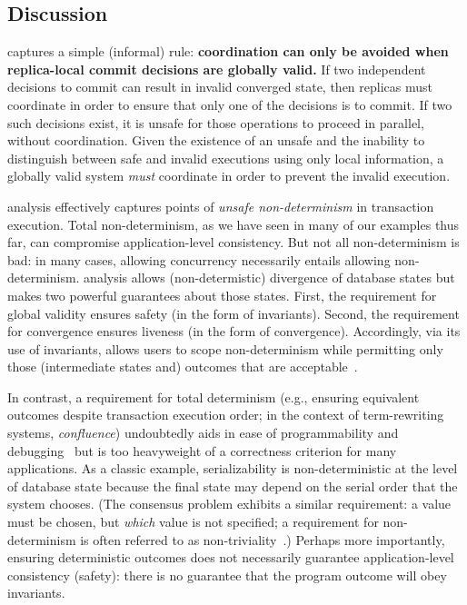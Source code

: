 \subsection{Discussion}

\iconfluence captures a simple (informal) rule: \textbf{coordination
  can only be avoided when replica-local commit decisions are globally
  valid.} If two independent decisions to commit can result in invalid
converged state, then replicas must coordinate in order to ensure that
only one of the decisions is to commit. If two such decisions exist,
it is unsafe for those operations to proceed in parallel, without
coordination. Given the existence of an unsafe and the inability to
distinguish between safe and invalid executions using only local
information, a globally valid system \textit{must} coordinate in order
to prevent the invalid execution.

\iconfluence analysis effectively captures points of \textit{unsafe
  non-determinism} in transaction execution. Total non-determinism, as
we have seen in many of our examples thus far, can compromise
application-level consistency. But not all non-determinism is bad: in
many cases, allowing concurrency necessarily entails allowing
non-determinism. \iconfluence analysis allows (non-determistic)
divergence of database states but makes two powerful guarantees about
those states. First, the requirement for global validity ensures
safety (in the form of invariants). Second, the requirement for
convergence ensures liveness (in the form of
convergence). Accordingly, via its use of invariants, \iconfluence
allows users to scope non-determinism while permitting only those
(intermediate states and) outcomes that are
acceptable~\cite{consistency-borders}.

In contrast, a requirement for total determinism (e.g., ensuring
equivalent outcomes despite transaction execution order; in the
context of term-rewriting systems, \textit{confluence}) undoubtedly
aids in ease of programmability and
debugging~\cite{blooml,calm,termrewriting} but is too heavyweight of a
correctness criterion for many applications. As a classic example,
serializability is non-deterministic at the level of database state
because the final state may depend on the serial order that the system
chooses. (The consensus problem exhibits a similar requirement: a
value must be chosen, but \textit{which} value is not specified; a
requirement for non-determinism is often referred to as
non-triviality~\cite{paxos-commit}.) Perhaps more importantly, ensuring
deterministic outcomes does not necessarily guarantee
application-level consistency (safety): there is no guarantee that the
program outcome will obey invariants.

